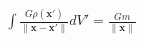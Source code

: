\documentclass[preview]{standalone}
\begin{document}
\begin{align*}
\int\frac{G\rho(\mathbf x')}{\|\mathbf x-\mathbf x'\|} dV' = \frac{Gm}{\|\mathbf x\|}
\end{align*}
\end{document}
